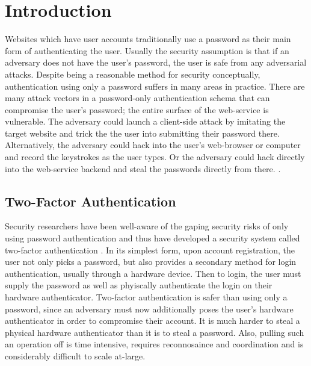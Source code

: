 \chapter{Introduction}

Websites which have user accounts traditionally use a password as their main form of authenticating the user. Usually the security assumption is that if an adversary does not have the user's password, the user is safe from any adversarial attacks. Despite being a reasonable method for security conceptually, authentication using only a password suffers in many areas in practice. There are many attack vectors in a password-only authentication schema that can compromise the user's password; the entire surface of the web-service is vulnerable. The adversary could launch a client-side attack by imitating the target website and trick the the user into submitting their password there. Alternatively, the adversary could hack into the user's web-browser or computer and record the keystrokes as the user types. Or the adversary could hack directly into the web-service backend and steal the passwords directly from there. \cite{TODO-a-paper-talking-about-different-types-of-password-attacks}.

\section{Two-Factor Authentication}


Security researchers have been well-aware of the gaping security risks of only using password authentication and thus have developed a security system called two-factor authentication \cite{TODO-2FA}. In its simplest form, upon account registration, the user not only picks a password, but also provides a secondary method for login authentication, usually through a hardware device. Then to login, the user must supply the password as well as phyiscally authenticate the login on their hardware authenticator. Two-factor authentication is safer than using only a password, since an adversary must now additionally poses the user's hardware authenticator in order to compromise their account. It is much harder to steal a physical hardware authenticator than it is to steal a password. Also, pulling such an operation off is time intensive, requires reconnosaince and coordination and is considerably difficult to scale at-large. 

